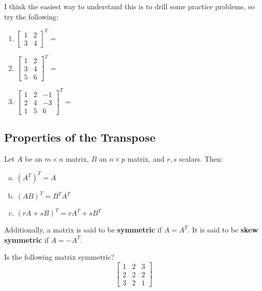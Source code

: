\documentclass[11pt]{exam}
\begin{document}
        \begin{questions}
            \item I think the easiest way to understand this is to drill some practice problems, so try the following:
            \begin{enumerate}
                \item $\begin{bmatrix} 1 & 2 \\ 3 & 4 \end{bmatrix}^T$ =
                \item $\begin{bmatrix} 1 & 2 \\ 3 & 4 \\ 5 & 6 \end{bmatrix}^T$ =
                \item $\begin{bmatrix} 1 & 2 & -1 \\ 2 & 4 & -3 \\ 1 & 5 & 6 \end{bmatrix}^T$ =
            \end{enumerate}
        \end{questions}

    \pagebreak
    \subsection{Properties of the Transpose}
        Let $A$ be an $m \times n$ matrix, $B$ an $n \times p$ matrix, and $r, s$ scalars. Then:
        \begin{enumerate}[a.]
            \item $(A^T)^T = A$
            \item $(AB)^T = B^T A^T$
            \item $(rA + sB)^T = rA^T + sB^T$
        \end{enumerate}
        Additionally, a matrix is said to be \textbf{symmetric} if $A = A^T$. It is said to be \textbf{skew symmetric} if $A = -A^T$.

        \begin{questions}
            \item Is the following matrix symmetric?
            $$\begin{bmatrix}
                1 & 2 & 3 \\ 2 & 2 & 2 \\ 3 & 2 & 1
            \end{bmatrix}$$
        \end{questions}
\end{document}
